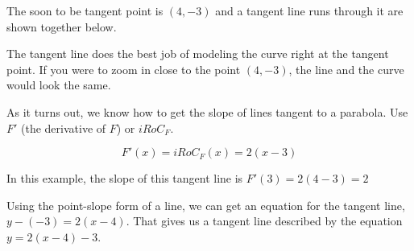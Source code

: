 \documentclass{ximera}
\begin{document}
The soon to be tangent point is $(4, -3)$ and a tangent line runs through it are shown together below.







\begin{image}
\end{image}






The tangent line does the best job of modeling the curve right at the tangent point. If you were to zoom in close to the point $(4, -3)$, the line and the curve would look the same.


As it turns out, we know how to get the slope of lines tangent to a parabola.  Use $F'$ (the derivative of $F$) or $iRoC_F$.   

\[ 
F'(x)=iRoC_F(x) = 2 (x - 3)
\] 

In this example, the slope of this tangent line is $F'(3) = 2 (4-3) = 2$ 

Using the point-slope form of a line, we can get an equation for the tangent line, $y - (-3)=2 (x-4)$. That gives us a tangent line described by the equation $y = 2 (x - 4) - 3$.
\end{document}
